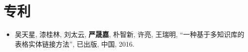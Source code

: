 \section{专利}
\begin{itemize}
  \item 吴天星, 漆桂林, 刘太云, \textbf{严晟嘉}, 朴智新, 许亮, 王瑞明, ``一种基于多知识库的表格实体链接方法'', 已出版, 中国, 2016.
\end{itemize}